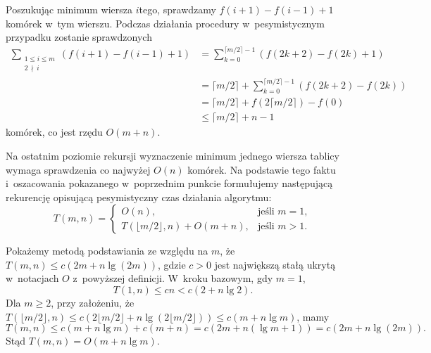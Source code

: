 Poszukując minimum wiersza $i$\nbhyphen tego, sprawdzamy $f(i+1)-f(i-1)+1$ komórek w~tym wierszu.
Podczas działania procedury w~pesymistycznym przypadku zostanie sprawdzonych
\begin{align*}
	\sum_{\substack{1\le i\le m\\2\,\nmid\,i}}(f(i+1)-f(i-1)+1) &= \sum_{k=0}^{\lceil m/2\rceil-1}(f(2k+2)-f(2k)+1) \\[-4mm]
	&= \lceil m/2\rceil+\sum_{k=0}^{\lceil m/2\rceil-1}(f(2k+2)-f(2k)) \\[1mm]
	&= \lceil m/2\rceil+f(2\lceil m/2\rceil)-f(0) \\[2mm]
	&\le \lceil m/2\rceil+n-1
\end{align*}
komórek, co jest rzędu $O(m+n)$.

\subproblem %
Na ostatnim poziomie rekursji wyznaczenie minimum jednego wiersza tablicy wymaga sprawdzenia co najwyżej $O(n)$ komórek.
Na podstawie tego faktu i~oszacowania pokazanego w~poprzednim punkcie formułujemy następującą rekurencję opisującą pesymistyczny czas działania algorytmu:
\[
	T(m,n) =
	\begin{cases}
		O(n), & \text{jeśli $m=1$}, \\
		T(\lfloor m/2\rfloor,n)+O(m+n), & \text{jeśli $m>1$}.
	\end{cases}
\]

Pokażemy metodą podstawiania ze względu na $m$, że $T(m,n)\le c(2m+n\lg(2m))$, gdzie $c>0$ jest największą stałą ukrytą w~notacjach $O$ z~powyższej definicji.
W~kroku bazowym, gdy $m=1$,
\[
	T(1,n) \le cn < c(2+n\lg2).
\]
Dla $m\ge2$, przy założeniu, że $T(\lfloor m/2\rfloor,n)\le c(2\lfloor m/2\rfloor+n\lg(2\lfloor m/2\rfloor))\le c(m+n\lg m)$, mamy
\[
	T(m,n) \le c(m+n\lg m)+c(m+n) = c(2m+n(\lg m+1)) = c(2m+n\lg(2m)).
\]
Stąd $T(m,n)=O(m+n\lg m)$.
